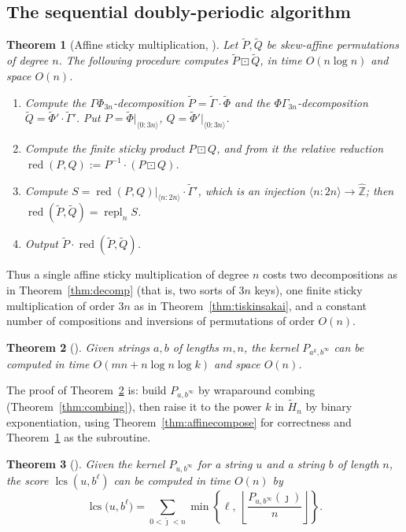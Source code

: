 \documentclass[10pt]{article}
\newtheorem{theorem}{Theorem}
\newcommand{\lcs}{\operatorname{lcs}}
\newcommand{\Zh}{\widehat{\mathbb{Z}}}
\newcommand{\stick}{\boxdot}
\newcommand{\red}{\operatorname{red}}
\newcommand{\repl}{\operatorname{repl}}
\begin{document}
\subsection{The sequential doubly-periodic algorithm}\label{sec:sequential}

\begin{theorem}[Affine sticky multiplication,
{\cite[Theorems 42, 44, Remark 43]{GZT25}}]\label{thm:affinesticky}
Let $\tilde P,\tilde Q$ be skew-affine permutations of degree $n$. The
following procedure computes $\tilde P\stick\tilde Q$, in time
$O(n\log n)$ and space $O(n)$.
\begin{enumerate}
\item Compute the $\Gamma\Phi_{3n}$-decomposition
$\tilde P=\tilde\Gamma\cdot\tilde\Phi$ and the
$\Phi\Gamma_{3n}$-decomposition $\tilde Q=\tilde\Phi'\cdot\tilde\Gamma'$. Put
$P=\tilde\Phi|_{\langle 0:3n\rangle}$,
$Q=\tilde\Phi'|_{\langle 0:3n\rangle}$.
\item Compute the finite sticky product $P\stick Q$, and from it the
relative reduction $\red(P,Q):=P^{-1}\cdot(P\stick Q)$.
\item Compute $S=\red(P,Q)|_{\langle n:2n\rangle}\cdot\tilde\Gamma'$, which is
an injection $\langle n:2n\rangle\to\Zh$; then
$\red(\tilde P,\tilde Q)=\repl_n S$.
\item Output $\tilde P\cdot\red(\tilde P,\tilde Q)$.
\end{enumerate}
\end{theorem}

Thus a single affine sticky multiplication of degree $n$ costs two
decompositions as in Theorem~\ref{thm:decomp} (that is, two sorts of $3n$
keys), one finite sticky multiplication of order $3n$ as in
Theorem~\ref{thm:tiskinsakai}, and a constant number of compositions and
inversions of permutations of order $O(n)$.

\begin{theorem}[{\cite[Theorem 45]{GZT25}}]\label{thm:kernelpower}
Given strings $a,b$ of lengths $m,n$, the kernel $P_{a^k,b^\infty}$ can be
computed in time $O(mn+n\log n\log k)$ and space $O(n)$.
\end{theorem}

The proof of Theorem~\ref{thm:kernelpower} is: build $P_{a,b^\infty}$ by
wraparound combing (Theorem~\ref{thm:combing}), then raise it to the power $k$
in $\tilde H_n$ by binary exponentiation, using
Theorem~\ref{thm:affinecompose} for correctness and
Theorem~\ref{thm:affinesticky} as the subroutine.

\begin{theorem}[{\cite[Theorem 46]{GZT25}}]\label{thm:score}
Given the kernel $P_{u,b^\infty}$ for a string $u$ and a string $b$ of length
$n$, the score $\lcs(u,b^\ell)$ can be computed in time $O(n)$ by
\[
\lcs\bigl(u,b^\ell\bigr)
=\sum_{0<\hat\jmath<n}
\min\left\{\ell,\ \left\lfloor
\frac{P_{u,b^\infty}(\hat\jmath)}{n}\right\rfloor\right\}.
\]
\end{theorem}
\end{document}
